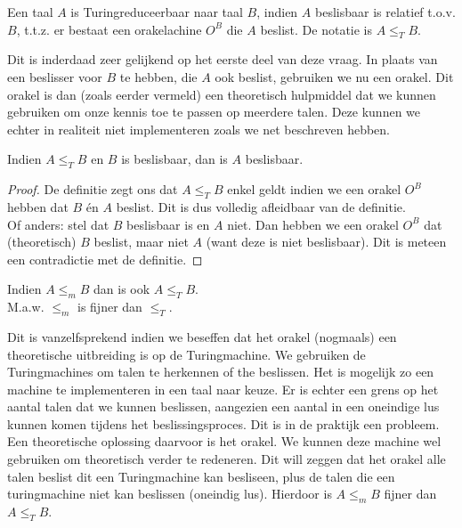 \begin{theorem}[Turingreduceerbaar]
	Een taal $A$ is Turingreduceerbaar naar taal $B$, indien $A$ beslisbaar is relatief t.o.v. $B$, t.t.z. er bestaat een orakelachine $O^B$ die $A$ beslist. De notatie is $A \leq_T B$.
\end{theorem}

Dit is inderdaad zeer gelijkend op het eerste deel van deze vraag. In plaats van een beslisser voor $B$ te hebben, die $A$ ook beslist, gebruiken we nu een orakel. Dit orakel is dan (zoals eerder vermeld) een theoretisch hulpmiddel dat we kunnen gebruiken om onze kennis toe te passen op meerdere talen. Deze kunnen we echter in realiteit niet implementeren zoals we net beschreven hebben.

\begin{theorem}
	Indien $A \leq_T B$ en $B$ is beslisbaar, dan is $A$ beslisbaar.
\end{theorem}

\begin{proof}
	De definitie zegt ons dat $A \leq_T B$ enkel geldt indien we een orakel $O^B$ hebben dat $B$ \'en $A$ beslist. Dit is dus volledig afleidbaar van de definitie.\\
	Of anders: stel dat $B$ beslisbaar is en $A$ niet. Dan hebben we een orakel $O^B$ dat (theoretisch) $B$ beslist, maar niet $A$ (want deze is niet beslisbaar). Dit is meteen een contradictie met de definitie.
\end{proof}

\begin{theorem}
	Indien $A \leq_m B$ dan is ook $A \leq_T B$.\\
	M.a.w. $\leq_m$ is fijner dan $\leq_T$.
\end{theorem}

Dit is vanzelfsprekend indien we beseffen dat het orakel (nogmaals) een theoretische uitbreiding is op de Turingmachine. We gebruiken de Turingmachines om talen te herkennen of the beslissen. Het is mogelijk zo een machine te implementeren in een taal naar keuze. Er is echter een grens op het aantal talen dat we kunnen beslissen, aangezien een aantal in een oneindige lus kunnen komen tijdens het beslissingsproces. Dit is in de praktijk een probleem. Een theoretische oplossing daarvoor is het orakel. We kunnen deze machine wel gebruiken om theoretisch verder te redeneren. Dit will zeggen dat het orakel alle talen beslist dit een Turingmachine kan besliseen, plus de talen die een turingmachine niet kan beslissen (oneindig lus). Hierdoor is $A \leq_m B$ fijner dan $A \leq_T B$.
